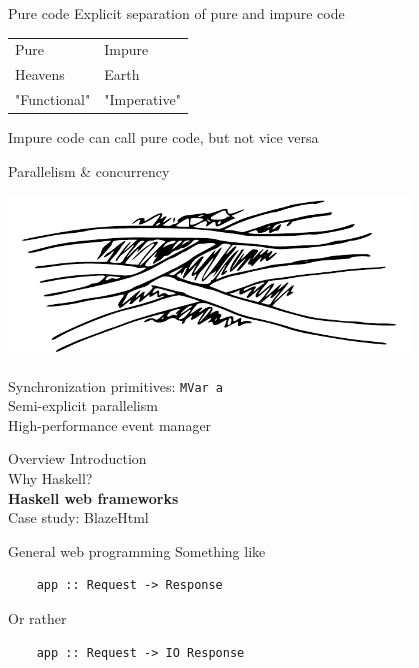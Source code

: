 \documentclass[20pt]{beamer}
\newcommand{\vspaced}{
    \vspace{5mm}
}
\begin{document}
\begin{frame}{Pure code}
    Explicit separation of pure and impure code \\
    \vspaced
    \begin{tabular}{l|l}
        Pure         & Impure \\
        Heavens      & Earth  \\
        "Functional" & "Imperative"
    \end{tabular}
    \newline
    \vspaced

    Impure code can call pure code, but not vice versa
\end{frame}

\begin{frame}[fragile]{Parallelism \& concurrency}
    \begin{center}
    \includegraphics[width=0.8\textwidth]{images/parallel.pdf}
    \end{center}
    Synchronization primitives: \texttt{MVar a} \\
    Semi-explicit parallelism \\
    High-performance event manager \\
    \vspaced
\end{frame}


\begin{frame}{Overview}
    Introduction \\
    Why Haskell? \\
    \textbf{Haskell web frameworks} \\
    Case study: BlazeHtml
\end{frame}

\begin{frame}[fragile]{General web programming}
    Something like
    \begin{lstlisting}
    app :: Request -> Response
    \end{lstlisting}

    \vspaced
    Or rather
    \begin{lstlisting}
    app :: Request -> IO Response
    \end{lstlisting}
\end{frame}
\end{document}

